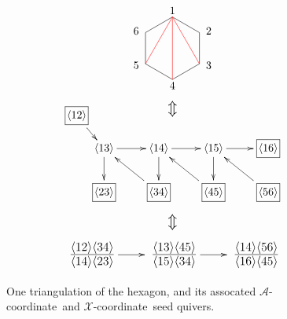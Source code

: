 \documentclass[11pt]{article}
\def\ket#1{\langle #1 \rangle}
\def\xcoord{$\mathcal{X}$-coordinate}
\def\acoord{$\mathcal{A}$-coordinate}
\def\drawLabeledHexagon{
\coordinate (P1) at (90:1);
\coordinate (P2) at (30:1);
\coordinate (P3) at (330:1);
\coordinate (P4) at (270:1);
\coordinate (P5) at (210:1);
\coordinate (P6) at (150:1);
\draw (P1) -- (P2) -- (P3) -- (P4) -- (P5) -- (P6) -- cycle;
\draw (0,1.2) node {1};
\draw (30:1.1) node[anchor=west] {2};
\draw (330:1.1) node[anchor=west] {3};
\draw (270:1.2) node {4};
\draw (210:1.1) node[anchor=east] {5};
\draw (150:1.1) node[anchor=east] {6};
}
\begin{document}
\begin{figure}
\begin{equation*}
\begin{gathered}
\begin{tikzpicture}
	\drawLabeledHexagon
  	\draw[color=red] (P1) -- (P3);
  	\draw[color=red] (P1) -- (P4);
  	\draw[color=red] (P1) -- (P5);
\end{tikzpicture}
\\ \scalebox{1.4}{$\Updownarrow$}
\\ \ \vspace{-1.1cm} \ \\
\begin{xy} 0;<1pt,0pt>:<0pt,-1pt>::
	(25,30) *+{\langle 13\rangle} ="0",
	(75,30) *+{\langle 14\rangle} ="1",
	(125,30) *+{\langle 15\rangle} ="2",
	(0,0) *+{\framebox[5ex]{$\langle 12\rangle$}} ="3",
	(25,70) *+{\framebox[5ex]{$\langle 23\rangle$}} ="4",
	(75,70) *+{\framebox[5ex]{$\langle 34\rangle$}} ="5",
	(125,70) *+{\framebox[5ex]{$\langle 45\rangle$}} ="6",
	(175,70) *+{\framebox[5ex]{$\langle 56\rangle$}} ="7",
	(175,30) *+{\framebox[5ex]{$\langle 16\rangle$}} ="8",
	"0", {\ar"1"},
	"1", {\ar"2"},
	"3", {\ar"0"},
	"0", {\ar"4"},
	"5", {\ar"0"},
	"1", {\ar"5"},
	"6", {\ar"1"},
	"2", {\ar"6"},
	"7", {\ar"2"},
	"2", {\ar"8"},
\end{xy} \\ 
\ \vspace{-.4cm} \ \\ 
\scalebox{1.4}{$\Updownarrow$} \\ 
\ \vspace{-.4cm} \ \\ 
\begin{xy} 0;<1pt,0pt>:<0pt,-1pt>::
	(0,0) *+\txt{\fontsize{16pt}{16pt} $\frac{\ket{12}\ket{34}}{\ket{14}\ket{23}}$} ="0",
	(75,0) *+\txt{\fontsize{16pt}{16pt} $\frac{\ket{13}\ket{45}}{\ket{15}\ket{34}}$} ="1",
	(150,0) *+\txt{\fontsize{16pt}{16pt} $\frac{\ket{14}\ket{56}}{\ket{16}\ket{45}}$} ="2",
	"0", {\ar"1"},
	"1", {\ar"2"},
\end{xy}
\end{gathered} 
\end{equation*}
\caption{One triangulation of the hexagon, and its assocated \acoord\ and \xcoord\ seed quivers.}
\label{eq:gr26-seed}
\end{figure}
\end{document}
